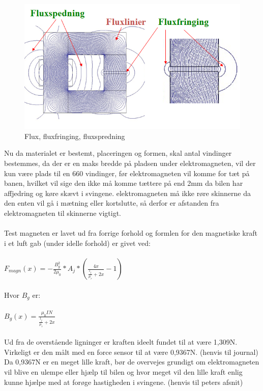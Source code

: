 \begin{figure}
\includegraphics[scale=0.4]{./Graphics/Flux}
\caption{Flux, fluxfringing, fluxspredning}
\label{Flux}
\end{figure}

Nu da materialet er bestemt, placeringen og formen, skal antal vindinger bestemmes, da der er en maks bredde på pladsen under elektromagneten, vil der kun være plads til en 660 vindinger, før elektromagneten vil komme for tæt på banen, hvilket vil sige den ikke må komme tættere på end 2mm da bilen har affjedring og køre skævt i svingene. elektromagneten må ikke røre skinnerne da den enten vil gå i mætning eller kortslutte, så derfor er afstanden fra elektromagneten til skinnerne vigtigt.\\
\\
Test magneten er lavet ud fra forrige forhold og formlen for den magnetiske kraft i et luft gab (under idelle forhold) er givet ved:\\
\\
$F_{magn}(x)=-{\frac{B^{2}_{g}}{2\mu_{0}}}* {A_{j}}* (\frac{4x}{{\frac{l_{j}}{\mu_{r}}}+2x}-1) $
\\
\\
Hvor $B_{g}$ er:
\\
\\
$ B_{g}(x)=\frac{\mu_{0}IN}{{\frac{l_{j}}{\mu_{r}}}+2x} $
\\
\\
Ud fra de overstående ligninger er kraften ideelt fundet til at være 1,309N. Virkeligt er den målt med en force sensor til at være 0,9367N. (henvis til journal) \\
Da 0,9367N er en meget lille kraft, bør de overvejes grundigt om elektromagneten vil blive en ulempe eller hjælp til bilen og hvor meget vil den lille kraft enlig kunne hjælpe med at forøge hastigheden i svingene. (henvis til peters afsnit)\\
